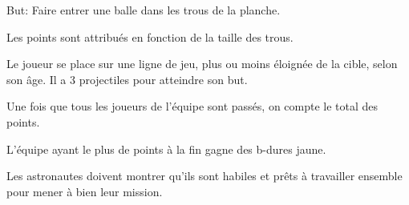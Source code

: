 \documentclass{grand-jeu}
\begin{document}
\begin{liste-materiel}
\end{liste-materiel}

\begin{regles}
But: Faire entrer une balle dans les trous de la planche.

Les points sont attribués en fonction de la taille des trous.

Le joueur se place sur une ligne de jeu, plus ou moins éloignée de la cible, selon son âge. Il a 3 projectiles pour atteindre son but. 

Une fois que tous les joueurs de l'équipe sont passés, on compte le total des points.

L'équipe ayant le plus de points à la fin gagne des b-dures jaune.
\end{regles}

\begin{imaginaire}
Les astronautes doivent montrer qu'ils sont habiles et prêts à travailler ensemble pour mener à bien leur mission.  
\end{imaginaire}

\begin{moments-stop}
\end{moments-stop}
\end{document}

